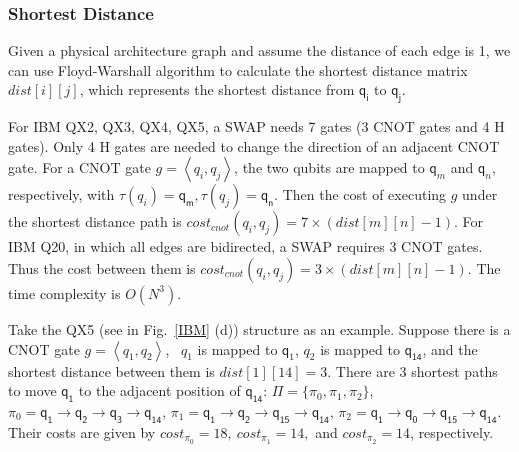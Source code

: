 \documentclass[runningheads]{llncs}
\begin{document}
\subsubsection{Shortest Distance}
Given a physical architecture graph and assume the distance of each edge is 1, we can use Floyd-Warshall algorithm to calculate the shortest distance matrix $dist[i][j]$, which represents the shortest distance from $\textsf{q}_{\textsf{i}}$ to $\textsf{q}_{\textsf{j}}$. 

For IBM QX2, QX3, QX4, QX5, a SWAP needs 7 gates (3 CNOT gates and 4 H gates). Only 4 H gates are needed to change the direction of an adjacent CNOT gate. 
For a CNOT gate $g=\left \langle  \textit{q}_\textit{i},\textit{q}_\textit{j} \right \rangle $,
the two qubits are mapped to $\textsf{q}_{m}$ and $\textsf{q}_{n}$, respectively, with $\tau(\textit{q}_\textit{i})=\textsf{q}_{\textsf{m}},\tau(\textit{q}_\textit{j})=\textsf{q}_{\textsf{n}}$. Then the cost of executing $g$ under the shortest distance path is $cost_{cnot}(\textit{q}_\textit{i},\textit{q}_\textit{j})=7 \times( dist[m][n]-1)$. For IBM Q20, in which all edges are bidirected, a SWAP requires 3 CNOT gates. Thus the cost between them is $cost_{cnot}(\textit{q}_\textit{i},\textit{q}_\textit{j})=3 \times( dist[m][n]-1)$. The time complexity is $O (N^{3})$.
\begin{example}
	Take the QX5 (see in Fig.~\ref{IBM} (d))    structure  as an example. Suppose there is a CNOT gate $g=\left \langle  \textit{q}_\textit{1}, \textit{q}_\textit{2} \right \rangle $, \ $\textit{q}_\textit{1}$ is mapped to $\textsf{q}_{1}$,  $\textit{q}_\textit{2}$ is mapped to $\textsf{q}_{\textsf{14}}$, and the shortest distance between them  is $dist[1][14]=3$. There are 3 shortest paths to move $\textsf{q}_{\textsf{1}}$ to the adjacent position of 
$\textsf{q}_{\textsf{14}}$:
$\Pi=\{\pi_{0},\pi_{1},\pi_{2}\}$, 
$\pi_{0}={\textsf{q}_{\textsf{1}}\rightarrow \textsf{q}_{\textsf{2}} \rightarrow \textsf{q}_{\textsf{3}} \rightarrow \textsf{q}_{\textsf{14}}}$,
$\pi_{1}={\textsf{q}_{\textsf{1}}\rightarrow \textsf{q}_{\textsf{2}} \rightarrow \textsf{q}_{\textsf{15}} \rightarrow \textsf{q}_{\textsf{14}}}$,
$\pi_{2}={\textsf{q}_{\textsf{1}}\rightarrow \textsf{q}_{\textsf{0}} \rightarrow \textsf{q}_{\textsf{15}} \rightarrow \textsf{q}_{\textsf{14}}}$.
Their costs are given by 
$cost_{\pi_{0}}=18,\ cost_{\pi_{1}}=14,$ and $ cost_{\pi_{2}}=14$, respectively.
\end{example}
\end{document}
